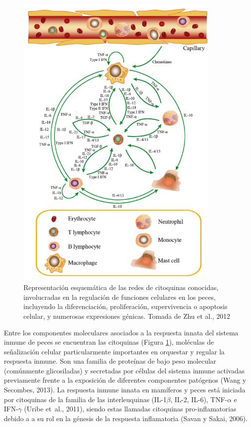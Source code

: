\documentclass[12pt,letterpaper,oneside]{scrbook}
\begin{document}
\begin{figure}[h!]
    \centering
    \includegraphics[width=10cm]{citoquinas} 
    \caption {Representación esquemática de las redes de citoquinas conocidas, involucradas en la regulación de funciones celulares en los peces, incluyendo la diferenciación, proliferación, supervivencia o apoptosis celular, y numerosas expresiones génicas. Tomada de Zhu et al., 2012}
    \label {fig:citoquinas}
\end{figure}

Entre los componentes moleculares asociados a la respuesta innata del
sistema inmune de peces se encuentran las citoquinas (Figura
\ref{fig:citoquinas}), moléculas de señalización celular particularmente
importantes en orquestar y regular la respuesta inmune. Son una familia
de proteínas de bajo peso molecular (comúnmente glicosiladas) y
secretadas por células del sistema inmune activadas previamente frente a
la exposición de diferentes componentes patógenos (Wang y Secombes,
2013). La respuesta inmune innata en mamíferos y peces está iniciada por
citoquinas de la familia de las interleuquinas (IL-1\(\beta\), IL-2,
IL-6), TNF-\(\alpha\) e IFN-\(\gamma\) (Uribe et~al., 2011), siendo
estas llamadas citoquinas pro-inflamatorias debido a a su rol en la
génesis de la respuesta inflamatoria (Savan y Sakai, 2006).
\end{document}
